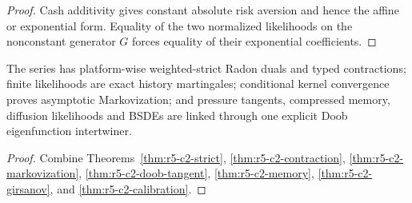 \begin{proof}
Cash additivity gives constant absolute risk aversion and hence the affine or
exponential form.  Equality of the two normalized likelihoods on the
nonconstant generator \(G\) forces equality of their exponential
coefficients.
\end{proof}

\begin{theorem}
\label{thm:r5-c2-main}
The series has platform-wise weighted-strict Radon duals and typed
contractions; finite likelihoods are exact history martingales; conditional
kernel convergence proves asymptotic Markovization; and pressure tangents,
compressed memory, diffusion likelihoods and BSDEs are linked through one
explicit Doob eigenfunction intertwiner.
\end{theorem}

\begin{proof}
Combine Theorems~\ref{thm:r5-c2-strict},
\ref{thm:r5-c2-contraction}, \ref{thm:r5-c2-markovization},
\ref{thm:r5-c2-doob-tangent}, \ref{thm:r5-c2-memory},
\ref{thm:r5-c2-girsanov}, and \ref{thm:r5-c2-calibration}.
\end{proof}
